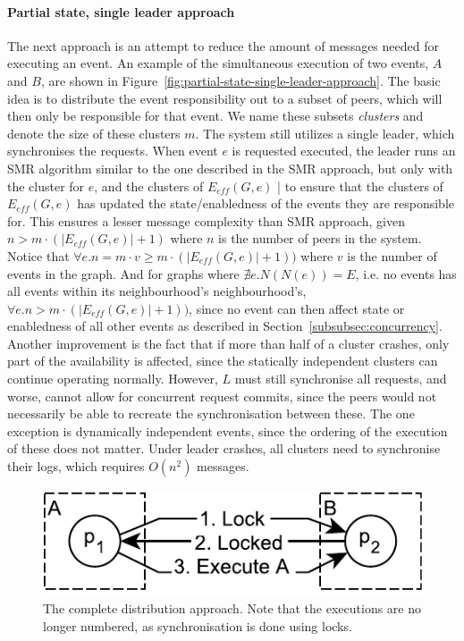 \documentclass{article}
\begin{document}
	\paragraph{Partial state, single leader approach}
	The next approach is an attempt to reduce the amount of messages needed for executing an event.
    An example of the simultaneous execution of two events, $A$ and $B$, are shown in Figure~\ref{fig:partial-state-single-leader-approach}.
	The basic idea is to distribute the event responsibility out to a subset of peers, which will then only be responsible for that event.
	We name these subsets \textit{clusters} and denote the size of these clusters $m$.
	The system still utilizes a single leader, which synchronises the requests.
	When event $e$ is requested executed, the leader runs an SMR algorithm similar to the one described in the SMR approach, but only with the cluster for $e$, and the clusters of $E_{eff}(G,e)$ | to ensure that the clusters of $E_{eff}(G,e)$ has updated the state/enabledness of the events they are responsible for.
	This ensures a lesser message complexity than SMR approach, given $n > m \cdot (|E_{eff}(G,e)|+1)$ where $n$ is the number of peers in the system.
	Notice that $\forall e. n = m \cdot v \geq m \cdot (|E_{eff}(G,e)|+1))$ where $v$ is the number of events in the graph.
	And for graphs where $\nexists e. N(N(e)) = E$, i.e. no events has all events within its neighbourhood's neighbourhood's, $\forall e. n > m \cdot (|E_{eff}(G,e)|+1))$, since no event can then affect state or enabledness of all other events as described in Section~\ref{subsubsec:concurrency}.
	Another improvement is the fact that if more than half of a cluster crashes, only part of the availability is affected, since the statically independent clusters can continue operating normally.
	However, $L$ must still synchronise all requests, and worse, cannot allow for concurrent request commits, since the peers would not necessarily be able to recreate the synchronisation between these.
	The one exception is dynamically independent events, since the ordering of the execution of these does not matter.
	Under leader crashes, all clusters need to synchronise their logs, which requires $O(n^2)$ messages.

    \FloatBarrier
    \begin{figure}[ht!]
        \center
        \includegraphics[scale=0.7]{figures/dcr-graphs/complete-distribution-approach.pdf}
        \caption{The complete distribution approach.
        Note that the executions are no longer numbered, as synchronisation is done using locks.}
        \label{fig:complete-distribution-approach}
    \end{figure}
    \FloatBarrier
\end{document}
